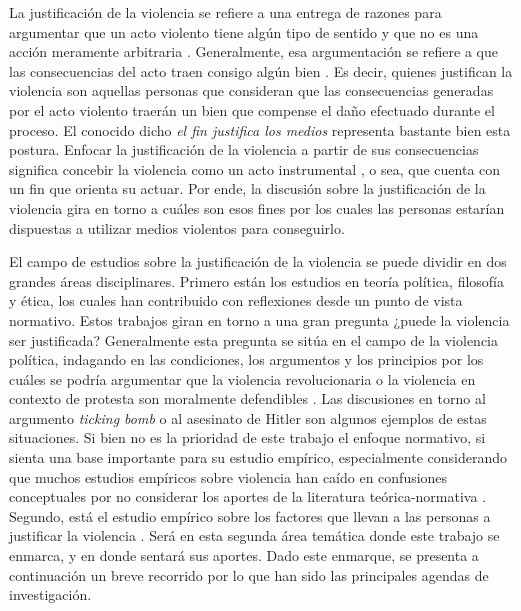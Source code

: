\documentclass[12pt,twoside]{templates/facsothesis}
\begin{document}
La justificación de la violencia se refiere a una entrega de razones para argumentar que un acto violento tiene algún tipo de sentido y que no es una acción meramente arbitraria \citep{Basaure2020}. Generalmente, esa argumentación se refiere a que las consecuencias del acto traen consigo algún bien \citep{Frazer2019}. Es decir, quienes justifican la violencia son aquellas personas que consideran que las consecuencias generadas por el acto violento traerán un bien que compense el daño efectuado durante el proceso. El conocido dicho \emph{el fin justifica los medios} representa bastante bien esta postura. Enfocar la justificación de la violencia a partir de sus consecuencias significa concebir la violencia como un acto instrumental \citep{Blumenthal1972, Arendt2005}, o sea, que cuenta con un fin que orienta su actuar. Por ende, la discusión sobre la justificación de la violencia gira en torno a cuáles son esos fines por los cuales las personas estarían dispuestas a utilizar medios violentos para conseguirlo.

El campo de estudios sobre la justificación de la violencia se puede dividir en dos grandes áreas disciplinares. Primero están los estudios en teoría política, filosofía y ética, los cuales han contribuido con reflexiones desde un punto de vista normativo. Estos trabajos giran en torno a una gran pregunta ¿puede la violencia ser justificada? Generalmente esta pregunta se sitúa en el campo de la violencia política, indagando en las condiciones, los argumentos y los principios por los cuáles se podría argumentar que la violencia revolucionaria o la violencia en contexto de protesta son moralmente defendibles \citep{Demirbas2019, Frazer2019, Gerd1969, Hills2011, Keane2004, Magil2008, Nielsen1981, Wells1970}. Las discusiones en torno al argumento \emph{ticking bomb} \citep[ver][]{APT2007, Bufacchi2006} o al asesinato de Hitler \citep[ver][]{Dean2005, Frazer2019} son algunos ejemplos de estas situaciones. Si bien no es la prioridad de este trabajo el enfoque normativo, si sienta una base importante para su estudio empírico, especialmente considerando que muchos estudios empíricos sobre violencia han caído en confusiones conceptuales por no considerar los aportes de la literatura teórica-normativa \citep{Bufacchi2007}. Segundo, está el estudio empírico sobre los factores que llevan a las personas a justificar la violencia \citep[e.g.][]{Blumenthal1972, Jackson2013}. Será en esta segunda área temática donde este trabajo se enmarca, y en donde sentará sus aportes. Dado este enmarque, se presenta a continuación un breve recorrido por lo que han sido las principales agendas de investigación.
\end{document}
